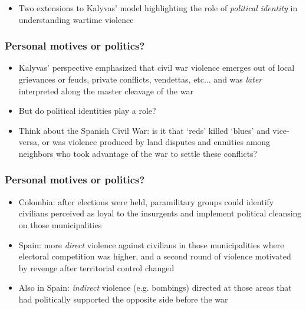 \documentclass[aspectratio=43]{beamer}
\begin{document}
\begin{frame}
\vspace{10pt}

\begin{itemize}
  \item Two extensions to Kalyvas' model highlighting the role of \textit{political identity} in understanding wartime violence
\end{itemize}

\end{frame}

\begin{frame}
\frametitle{Personal motives or politics?}
\centering

\begin{itemize}
  \item<1-> Kalyvas' perspective emphasized that civil war violence emerges out of local grievances or feuds, private conflicts, vendettas, etc... and was \textit{later} interpreted along the master cleavage of the war
  \item<2-> But do political identities play a role?
  \item<2-> Think about the Spanish Civil War: is it that `reds' killed `blues' and vice-versa, or was violence produced by land disputes and enmities among neighbors who took advantage of the war to settle these conflicts?
\end{itemize}

\end{frame}


\begin{frame}
\frametitle{Personal motives or politics?}
\centering

\begin{itemize}
  \item Colombia: after elections were held, paramilitary groups could identify civilians perceived as loyal to the insurgents and implement political cleansing on those municipalities
  \item Spain: more \textit{direct} violence against civilians in those municipalities where electoral competition was higher, and a second round of violence motivated by revenge after territorial control changed
  \item Also in Spain: \textit{indirect} violence (e.g. bombings) directed at those areas that had politically supported the opposite side before the war
\end{itemize}

\end{frame}
\end{document}
